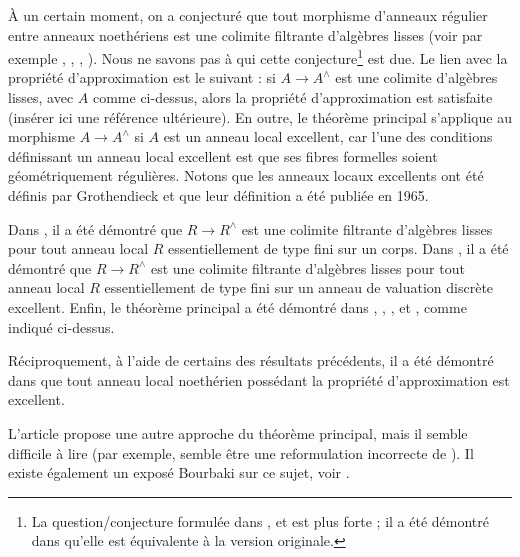 \medskip\noindent
À un certain moment, on a conjecturé que tout morphisme d'anneaux régulier entre
anneaux noethériens est une colimite filtrante d'algèbres lisses (voir par exemple
\cite{Raynaud-Rennes}, \cite{popescu-global}, \cite{Artin-power-series},
\cite{Artin-Denef}). Nous ne savons pas à qui cette conjecture\footnote{La
question/conjecture formulée dans \cite{Artin-power-series},
\cite{Artin-Denef} et \cite{popescu-global} est plus forte ; il a été démontré
dans \cite{Cipu} qu'elle est équivalente à la version originale.}
est due. Le lien avec la propriété d'approximation est le suivant : si
$A \to A^\wedge$ est une colimite d'algèbres lisses, avec $A$ comme ci-dessus,
alors la propriété d'approximation est satisfaite (insérer ici une référence
ultérieure). En outre, le théorème principal s'applique au morphisme
$A \to A^\wedge$ si $A$ est un anneau local excellent, car l'une des conditions
définissant un anneau local excellent est que ses fibres formelles soient
géométriquement régulières. Notons que les anneaux locaux excellents ont été
définis par Grothendieck et que leur définition a été publiée en 1965.

\medskip\noindent
Dans \cite{Artin-power-series}, il a été démontré que
$R \to R^\wedge$ est une colimite filtrante d'algèbres lisses pour tout anneau
local $R$ essentiellement de type fini sur un corps.
Dans \cite{Rotthaus-Artin}, il a été démontré que $R \to R^\wedge$ est une
colimite filtrante d'algèbres lisses pour tout anneau local $R$ essentiellement
de type fini sur un anneau de valuation discrète excellent.
Enfin, le théorème principal a été démontré dans
\cite{popescu-GND}, \cite{popescu-GNDA}, \cite{popescu-letter}, 
\cite{Ogoma} et \cite{swan}, comme indiqué ci-dessus.

\medskip\noindent
Réciproquement, à l'aide de certains des résultats précédents, il a été démontré
dans \cite{Rotthaus-excellent} que tout anneau local noethérien possédant la
propriété d'approximation est excellent.

\medskip\noindent
L'article \cite{Spivakovsky} propose une autre approche du théorème principal,
mais il semble difficile à lire (par exemple, \cite[lemme 5.2]{Spivakovsky}
semble être une reformulation incorrecte de \cite[lemme 3]{Elkik}). Il existe
également un exposé Bourbaki sur ce sujet, voir \cite{Teissier}.












